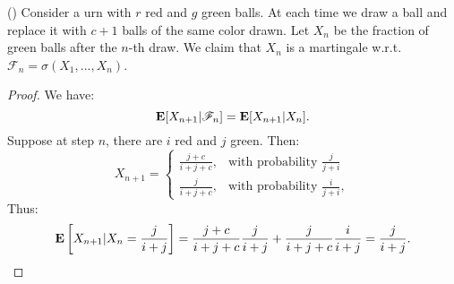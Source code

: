 \documentclass[../main/main.tex]{subfiles}
\begin{document}
\begin{example}() Consider a urn with $r$ red and $g$ green balls. At each time we draw a ball and replace it with $c+1$ balls of the same color drawn. Let $X_n$ be the fraction of green balls after the $n$-th draw. We claim that $X_n$ is a martingale w.r.t. $\mathscr{F}_n = \sigma(X_1, ... , X_n)$.
\end{example}
\begin{proof}
	We have: \[
		\text{\textbf{E}}[X_{n+1} | \mathscr{F}_n] = \text{\textbf{E}}[X_{n+1} | X_n].
	\] Suppose at step $n$, there are $i$ red and $j$ green. Then: \[
		X_{n+1} = \begin{cases}
			\frac{j+c}{i+j+c}, & \text{with probability } \frac{j}{j+i}  \\
			\frac{j}{i+j+c},   & \text{with probability } \frac{i}{j+i},
		\end{cases}
	\] Thus: \[
		\text{\textbf{E}} \left[ X_{n+1} | X_n = \frac{j}{i+j} \right] = \frac{j+c}{i+j+c} \frac{j}{i+j} + \frac{j}{i+j+c} \frac{i}{i+j} = \frac{j}{i+j}.
	\]
\end{proof}
\end{document}
